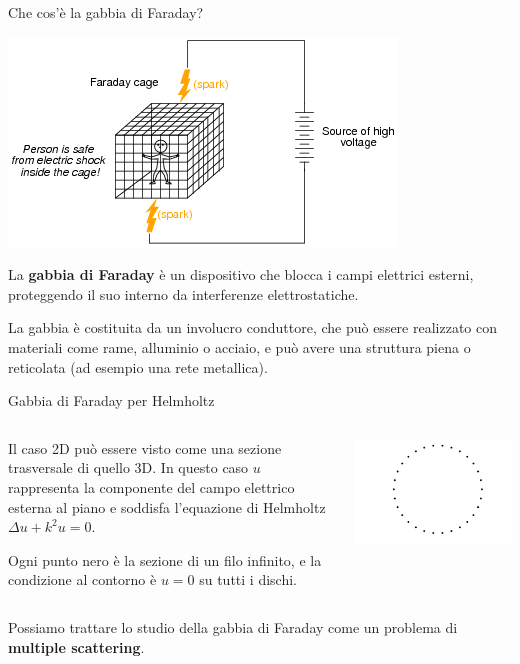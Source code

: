 \documentclass{beamer}
\begin{document}
	\begin{frame}{Che cos'è la gabbia di Faraday?}
		\begin{center}
			\includegraphics[width=.5\textwidth]{figs/cage.png}      
		\end{center}
		La \textbf{gabbia di Faraday} è un dispositivo che blocca i campi elettrici esterni, proteggendo il suo interno da interferenze elettrostatiche. 
		
		La gabbia è costituita da un involucro conduttore, che può essere realizzato con materiali come rame, alluminio o acciaio, e può avere una struttura piena o reticolata (ad esempio una rete metallica).
	\end{frame}
	
	\begin{frame}{Gabbia di Faraday per Helmholtz}
		\begin{columns}
			\begin{column}{.6\textwidth}
				Il caso 2D può essere visto come una sezione trasversale di quello 3D. In questo caso $u$ rappresenta la componente del campo elettrico esterna al piano e soddisfa l'equazione di Helmholtz $\Delta u + k^2 u = 0$.
				
				Ogni punto nero è la sezione di un filo infinito, e la condizione al contorno è $u=0$ su tutti i dischi.
			\end{column}
			\begin{column}{.4\textwidth}
				\includegraphics[width=\textwidth]{figs/wire.png}
			\end{column}
		\end{columns}
		\vspace*{0.3cm}
		\begin{block}{}
			Possiamo trattare lo studio della gabbia di Faraday come un problema di \textbf{multiple scattering}.
		\end{block}
	\end{frame}
	
\end{document}
